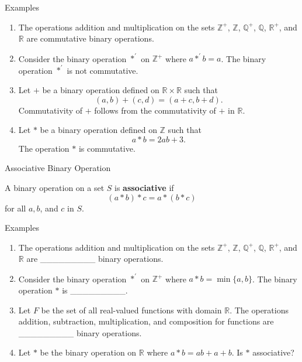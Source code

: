 \documentclass{beamer}
\begin{document}
\begin{frame}{Examples}
\begin{enumerate}
\justifying
\item The operations addition and multiplication on the sets $\mathbb{Z}^+$, $\mathbb{Z}$, $\mathbb{Q}^+$, $\mathbb{Q}$, $\mathbb{R}^+$, and $\mathbb{R}$ are commutative binary operations.
\pause
\item Consider the binary operation $*^{\prime}$ on $\mathbb{Z}^+$ where $a *^{\prime} b = a$. The binary operation $*^{\prime}$ is not commutative.
\pause
\item Let $+$ be a binary operation defined on $\mathbb{R} \times \mathbb{R}$ such that $$(a, b) + (c, d) = (a + c, b + d).$$ Commutativity of $+$ follows from the commutativity of $+$ in $\mathbb{R}$.
\pause
\item Let $*$ be a binary operation defined on $\mathbb{Z}$ such that $$a * b = 2ab + 3.$$ The operation $*$ is commutative.
\end{enumerate}
\end{frame}

\begin{frame}{Associative Binary Operation}
\begin{definition}
\justifying
A binary operation on a set $S$ is \textbf{associative} if $$(a * b) * c = a * (b * c)$$ for all $a, b$, and $c$ in $S$.
\end{definition}
\end{frame}

\begin{frame}{Examples}
\begin{enumerate}
\item The operations addition and multiplication on the sets $\mathbb{Z}^+$, $\mathbb{Z}$, $\mathbb{Q}^+$, $\mathbb{Q}$, $\mathbb{R}^+$, and $\mathbb{R}$ are \_\_\_\_\_\_\_\_\_ binary operations.
\item Consider the binary operation $*^{\prime}$ on $\mathbb{Z}^+$ where $a * b = \min\{a, b\}$. The binary operation $*$ is \_\_\_\_\_\_\_\_\_.
\item Let $F$ be the set of all real-valued functions with domain $\mathbb{R}$. The operations addition, subtraction, multiplication, and composition for functions are \_\_\_\_\_\_\_\_\_ binary operations. 
\item Let $*$ be the binary operation on $\mathbb{R}$ where $a * b = ab + a + b$. Is $*$ associative? 
\end{enumerate}    
\end{frame}
\end{document}

